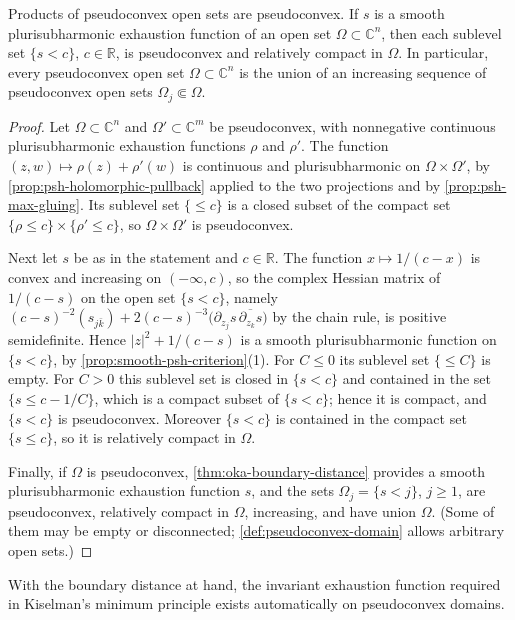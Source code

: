 \begin{corollary}\label{cor:pseudoconvex-sublevels-products}
Products of pseudoconvex open sets are pseudoconvex. If $s$ is a smooth plurisubharmonic exhaustion function of an open set $\Omega\subset\mathbb C^n$, then each sublevel set $\{s<c\}$, $c\in\mathbb R$, is pseudoconvex and relatively compact in $\Omega$. In particular, every pseudoconvex open set $\Omega\subset\mathbb C^n$ is the union of an increasing sequence of pseudoconvex open sets $\Omega_j\Subset\Omega$.
\end{corollary}
\begin{proof}
Let $\Omega\subset\mathbb C^n$ and $\Omega'\subset\mathbb C^m$ be pseudoconvex, with nonnegative continuous plurisubharmonic exhaustion functions $\rho$ and $\rho'$. The function $(z,w)\mapsto\rho(z)+\rho'(w)$ is continuous and plurisubharmonic on $\Omega\times\Omega'$, by \cref{prop:psh-holomorphic-pullback} applied to the two projections and by \cref{prop:psh-max-gluing}. Its sublevel set $\{\le c\}$ is a closed subset of the compact set $\{\rho\le c\}\times\{\rho'\le c\}$, so $\Omega\times\Omega'$ is pseudoconvex.

Next let $s$ be as in the statement and $c\in\mathbb R$. The function $x\mapsto1/(c-x)$ is convex and increasing on $(-\infty,c)$, so the complex Hessian matrix of $1/(c-s)$ on the open set $\{s<c\}$, namely $(c-s)^{-2}(s_{j\bar k})+2(c-s)^{-3}\bigl(\partial_{z_j}s\,\overline{\partial_{z_k}s}\bigr)$ by the chain rule, is positive semidefinite. Hence $|z|^2+1/(c-s)$ is a smooth plurisubharmonic function on $\{s<c\}$, by \cref{prop:smooth-psh-criterion}(1). For $C\le0$ its sublevel set $\{\le C\}$ is empty. For $C>0$ this sublevel set is closed in $\{s<c\}$ and contained in the set $\{s\le c-1/C\}$, which is a compact subset of $\{s<c\}$; hence it is compact, and $\{s<c\}$ is pseudoconvex. Moreover $\{s<c\}$ is contained in the compact set $\{s\le c\}$, so it is relatively compact in $\Omega$.

Finally, if $\Omega$ is pseudoconvex, \cref{thm:oka-boundary-distance} provides a smooth plurisubharmonic exhaustion function $s$, and the sets $\Omega_j=\{s<j\}$, $j\ge1$, are pseudoconvex, relatively compact in $\Omega$, increasing, and have union $\Omega$. (Some of them may be empty or disconnected; \cref{def:pseudoconvex-domain} allows arbitrary open sets.)
\end{proof}

With the boundary distance at hand, the invariant exhaustion function required in Kiselman's minimum principle exists automatically on pseudoconvex domains.

